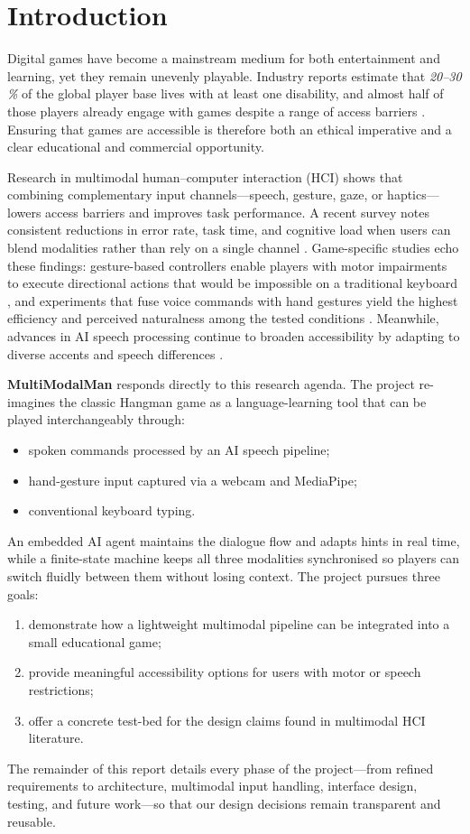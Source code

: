 \section{Introduction}
Digital games have become a mainstream medium for both entertainment and learning, yet they remain unevenly playable. Industry reports estimate that \emph{20–30 \%} of the global player base lives with at least one disability, and almost half of those players already engage with games despite a range of access barriers \cite{ablegamers2024}. Ensuring that games are accessible is therefore both an ethical imperative and a clear educational and commercial opportunity.

Research in multimodal human–computer interaction (HCI) shows that combining complementary input channels—speech, gesture, gaze, or haptics—lowers access barriers and improves task performance. A recent survey notes consistent reductions in error rate, task time, and cognitive load when users can blend modalities rather than rely on a single channel \cite{baig2020}. Game-specific studies echo these findings: gesture-based controllers enable players with motor impairments to execute directional actions that would be impossible on a traditional keyboard \cite{taheri2021}, and experiments that fuse voice commands with hand gestures yield the highest efficiency and perceived naturalness among the tested conditions \cite{cao2023}. Meanwhile, advances in AI speech processing continue to broaden accessibility by adapting to diverse accents and speech differences \cite{morris2019}.

\textbf{MultiModalMan} responds directly to this research agenda. The project re-imagines the classic Hangman game as a language-learning tool that can be played interchangeably through:

\begin{itemize}
  \item spoken commands processed by an AI speech pipeline;
  \item hand-gesture input captured via a webcam and MediaPipe;
  \item conventional keyboard typing.
\end{itemize}

An embedded AI agent maintains the dialogue flow and adapts hints in real time, while a finite-state machine keeps all three modalities synchronised so players can switch fluidly between them without losing context. The project pursues three goals:

\begin{enumerate}
  \item demonstrate how a lightweight multimodal pipeline can be integrated into a small educational game;
  \item provide meaningful accessibility options for users with motor or speech restrictions;
  \item offer a concrete test-bed for the design claims found in multimodal HCI literature.
\end{enumerate}

The remainder of this report details every phase of the project—from refined requirements to architecture, multimodal input handling, interface design, testing, and future work—so that our design decisions remain transparent and reusable.
